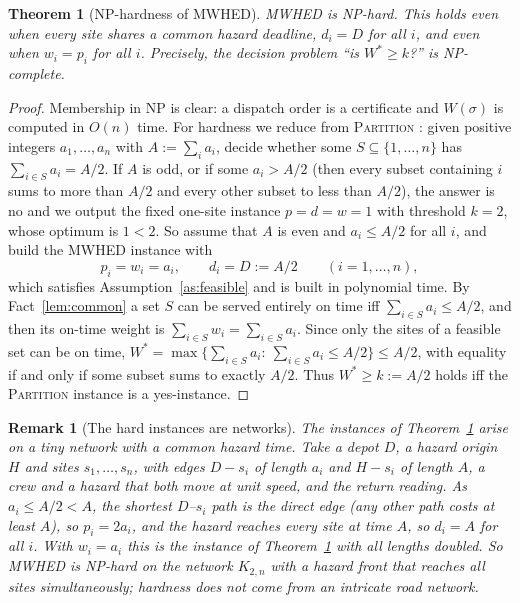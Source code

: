 \documentclass[pdflatex,sn-mathphys-ay]{sn-jnl}
\theoremstyle{thmstyleone}
\newtheorem{theorem}{Theorem}
\theoremstyle{thmstyletwo}
\newtheorem{remark}{Remark}
\theoremstyle{thmstylethree}
\begin{document}
\begin{theorem}[NP-hardness of MWHED]\label{thm:hardness}
MWHED is NP-hard. This holds even when every site shares a common
hazard deadline, $d_i=D$ for all $i$, and even when $w_i=p_i$ for all
$i$. Precisely, the decision problem ``is $W^\ast\ge k$?'' is
NP-complete.
\end{theorem}

\begin{proof}
Membership in NP is clear: a dispatch order is a certificate and
$W(\sigma)$ is computed in $O(n)$ time. For hardness we reduce from
\textsc{Partition} \citep{gareyjohnson1979}: given positive integers
$a_1,\dots,a_n$ with $A:=\sum_ia_i$, decide whether some
$S\subseteq\{1,\dots,n\}$ has $\sum_{i\in S}a_i=A/2$. If $A$ is odd, or if
some $a_i>A/2$ (then every subset containing $i$ sums to more than $A/2$
and every other subset to less than $A/2$), the answer is no and we output
the fixed one-site instance $p=d=w=1$ with threshold $k=2$, whose optimum
is $1<2$. So assume that $A$ is even and $a_i\le A/2$ for all $i$, and
build the MWHED instance with
\[
p_i=w_i=a_i,\qquad d_i=D:=A/2\qquad (i=1,\dots,n),
\]
which satisfies Assumption~\ref{as:feasible} and is built in polynomial
time. By Fact~\ref{lem:common} a set $S$ can be served entirely on
time iff $\sum_{i\in S}a_i\le A/2$, and then its on-time weight is
$\sum_{i\in S}w_i=\sum_{i\in S}a_i$. Since only the sites of a feasible
set can be on time, $W^\ast=\max\{\sum_{i\in S}a_i:\ \sum_{i\in S}a_i\le
A/2\}\le A/2$, with equality if and only if some subset sums to exactly
$A/2$. Thus $W^\ast\ge k:=A/2$ holds iff the \textsc{Partition} instance is
a yes-instance.
\end{proof}

\begin{remark}[The hard instances are networks]\label{rem:network}
The instances of Theorem~\ref{thm:hardness} arise on a tiny network with a
common hazard time. Take a depot $D$, a hazard origin $H$ and sites
$s_1,\dots,s_n$, with edges $D\!-\!s_i$ of length $a_i$ and $H\!-\!s_i$ of
length $A$, a crew and a hazard that both move at unit speed, and the
return reading. As $a_i\le A/2<A$, the shortest $D$--$s_i$ path is the
direct edge (any other path costs at least $A$), so $p_i=2a_i$, and the
hazard reaches every site at time $A$, so $d_i=A$ for all $i$. With
$w_i=a_i$ this is the instance of Theorem~\ref{thm:hardness} with all
lengths doubled. So MWHED is NP-hard on the network $K_{2,n}$ with a
hazard front that reaches all sites simultaneously; hardness does not
come from an intricate road network.
\end{remark}
\end{document}

